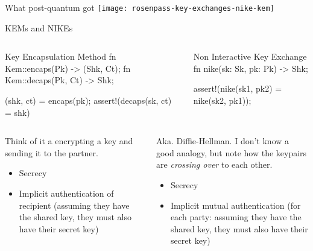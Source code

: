 \begin{frame}{What post-quantum got}
  \texttt{[image: rosenpass-key-exchanges-nike-kem]}
\end{frame}



\begin{frame}[fragile,T]{KEMs and NIKEs}
  \begin{columns}[t,fullwidth]
    \begin{column}{.48\linewidth}
\begin{rustblock}{Key Encapsulation Method}
fn Kem::encaps(Pk) -> (Shk, Ct);
fn Kem::decaps(Pk, Ct) -> Shk;

(shk, ct) = encaps(pk);
assert!(decaps(sk, ct) = shk)
\end{rustblock}
\end{column}\hfill
\begin{column}{.49\linewidth}
\begin{rustblock}{Non Interactive Key Exchange}
fn nike(sk: Sk, pk: Pk) -> Shk;

assert!(nike(sk1, pk2) = nike(sk2, pk1));
\end{rustblock}
\end{column}
\end{columns}\hfill
\begin{columns}[t,fullwidth]
\begin{column}{.48\linewidth}
  Think of it a encrypting a key and sending it
        to the partner.

        \begin{itemize}
          \item Secrecy
          \item Implicit authentication of recipient
            (assuming they have the shared key, they must
            also have their secret key)
        \end{itemize}
\end{column}\hfill
\begin{column}{.48\linewidth}
        Aka. Diffie-Hellman.
        I don't know a good analogy, but note how the
        keypairs are \emph{crossing over} to each other.

        \begin{itemize}
          \item Secrecy
          \item Implicit mutual authentication
            (for each party: assuming they have the shared key, they must
            also have their secret key)
        \end{itemize}
    \end{column}
  \end{columns}
\end{frame}


